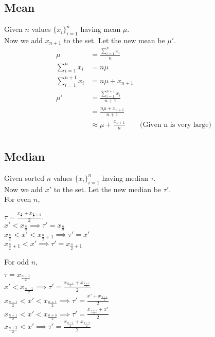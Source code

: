 \documentclass[11pt]{article}
\begin{document}
\subsection*{Mean}
Given $n$ values $\{x_i\}^n_{i=1}$ having mean $\mu$.\\
Now we add $x_{n+1}$ to the set. Let the new mean be $\mu'$.
\begin{equation*}
    \begin{split}
    \mu &= \frac{\sum_{i=1}^{n} x_i}{n} \\
    \sum_{i=1}^{n} x_i &= n\mu \\
    \sum_{i=1}^{n+1} x_i &= n\mu + x_{n+1} \\
    \mu' &= \frac{\sum_{i=1}^{n+1} x_i}{n+1} \\
        &= \frac{n\mu + x_{n+1}}{n+1} \\
        &\approx \mu + \frac{x_{n+1}}{n} \hspace{2em} \text{(Given n is very large)} \\
    \end{split}
\end{equation*}

\subsection*{Median}
Given sorted $n$ values $\{x_i\}^n_{i=1}$ having median $\tau$. \\
Now we add $x'$ to the set. Let the new median be $\tau'$. \\

For even $n$,
\begin{center}
$\tau = \frac{x_{\frac{n}{2}} + x_{\frac{n}{2}+1}}{2}$.\\
$x' < x_{\frac{n}{2}} \implies \tau' = x_{\frac{n}{2}}$ \\
$x_{\frac{n}{2}} < x' < x_{\frac{n}{2}+1} \implies \tau' = x'$ \\
$x_{\frac{n}{2}+1} < x' \implies \tau' = x_{\frac{n}{2}+1}$ \\
\end{center}

For odd $n$,
\begin{center}
$\tau = x_{\frac{n+1}{2}}$ \\
$x' < x_{\frac{n-1}{2}} \implies \tau' = \frac{x_{\frac{n-1}{2}} + x_{\frac{n+1}{2}}}{2}$ \\
$x_{\frac{n-1}{2}} < x' < x_{\frac{n+1}{2}} \implies \tau' = \frac{x' + x_{\frac{n+1}{2}}}{2}$ \\
$x_{\frac{n+1}{2}} < x' < x_{\frac{n+3}{2}} \implies \tau' = \frac{x_{\frac{n+1}{2}} + x'}{2}$ \\
$x_{\frac{n+3}{2}} < x' \implies \tau' = \frac{x_{\frac{n+1}{2}} + x_{\frac{n+3}{2}}}{2}$
\end{center}
\end{document}
